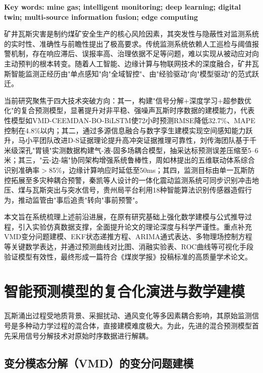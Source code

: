 \documentclass[twocolumn,a4paper]{ctexart}
\numberwithin{equation}{section}
\begin{document}
\vspace{0.5\baselineskip}
\noindent{}\bfseries Key words: \normalfont mine gas; intelligent monitoring; deep learning; digital twin; multi-source information fusion; edge computing

\vspace{1\baselineskip}

\songti

矿井瓦斯灾害是制约煤矿安全生产的核心风险因素，其突发性与隐蔽性对监测系统的实时性、准确性与前瞻性提出了极高要求。传统监测系统依赖人工巡检与阈值报警机制，存在响应滞后、误报率高、治理依据不足等问题，难以实现从被动应对向主动预判的根本转变。随着人工智能、边缘计算与物联网技术的深度融合，矿井瓦斯智能监测正经历由"单点感知"向"全域智控"、由"经验驱动"向"模型驱动"的范式跃迁。

当前研究聚焦于四大技术突破方向：其一，构建"信号分解+深度学习+超参数优化"的复合预测模型，显著提升对非平稳、强噪声瓦斯时序数据的建模能力，代表性模型如VMD-CEEMDAN-BO-BiLSTM使72小时预测RMSE降低32.7\%、MAPE控制在4.8\%以内；其二，通过多源信息融合与数字孪生建模实现空间感知能力跃升，马小平团队改进D-S证据理论提升高冲突证据推理可靠性，刘传海团队基于千米级深孔"胃镜"实测数据构建气-液-固多场耦合模型，抽采达标预测误差压缩至5--6米；其三，"云-边-端"协同架构增强系统鲁棒性，周如林提出的五维联动体系综合识别准确率$>$85\%，边缘计算响应时延低至50ms；其四，监测目标由单一瓦斯防控拓展至多灾种耦合预警，秦凯等人设计的一体化震动监测系统可同步识别冲击地压、煤与瓦斯突出与突水信号，贵州局平台利用18种智能算法识别传感器造假行为，推动监管由"事后追责"转向"事前预警"。

本文旨在系统梳理上述前沿进展，在原有研究基础上强化数学建模与公式推导过程，引入实验仿真数据支撑，全面提升论文的理论深度与科学严谨性。重点补充VMD变分问题建模、EKF状态递推方程、ARIMA通式表达、多物理场控制方程等关键数学表达，并通过预测曲线对比图、消融实验表、ROC曲线等可视化手段验证模型有效性，最终形成一篇符合《煤炭学报》投稿标准的高质量学术论文。

\section{智能预测模型的复合化演进与数学建模}

瓦斯涌出过程受地质背景、采掘扰动、通风变化等多因素耦合影响，其原始监测信号是多种动力学过程的混合体，直接建模难度极大。为此，先进的混合预测模型首先采用信号分解技术对原始时序数据进行解耦。

\subsection{变分模态分解（VMD）的变分问题建模}
\end{document}
